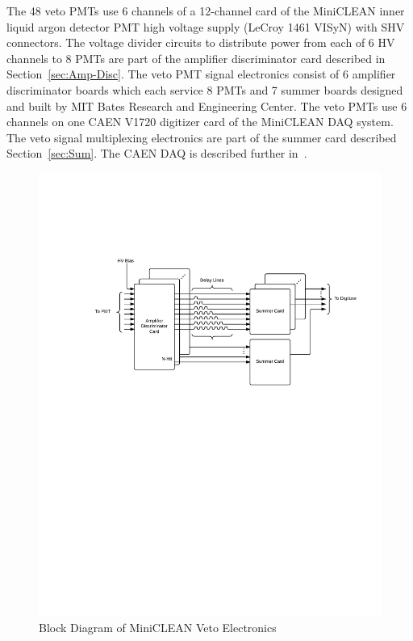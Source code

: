 \documentclass{JINST}
\begin{document}
The 48 veto PMTs use 6 channels of a 12-channel card of the
MiniCLEAN inner liquid argon detector PMT high voltage supply (LeCroy 1461 VISyN)
with SHV connectors. The voltage divider circuits to distribute power
from each of 6 HV channels to 8 PMTs are part of the amplifier
discriminator card described in Section~\ref{sec:Amp-Disc}. The veto
PMT signal electronics consist of 6 amplifier discriminator boards which each service
8 PMTs and 7 summer boards designed and built by MIT Bates Research and Engineering Center.
The veto PMTs use 6 channels on one CAEN V1720 digitizer
card of the MiniCLEAN DAQ system. The veto signal multiplexing
electronics are part of the summer card described
Section~\ref{sec:Sum}. The CAEN DAQ is described further
in~\cite{ref:gastler_thesis}.

\begin{figure}[ht]
\begin{center}
\includegraphics[width=5in, keepaspectratio=true, trim=1.25in 5.75in 0.5in 2in, clip=true]{graphics/block}
\caption{Block Diagram of MiniCLEAN Veto Electronics
\label{fig:block_diagram}}
\end{center}
\end{figure}
\end{document}
